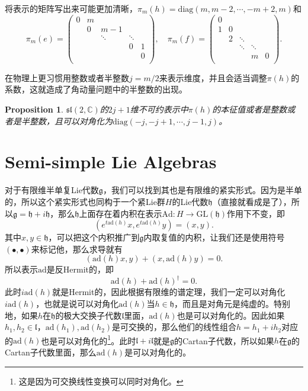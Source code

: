 \documentclass[8pt]{book}
\theoremstyle{plain}
\newtheorem{pro}[defi]{Proposition}
\newcommand{\lag}{{\mathfrak{g}}}  %
\newcommand{\ad}{{\mathrm{ad}}}
\begin{document}
将表示的矩阵写出来可能更加清晰，$\pi_m(h)=\mathrm{diag}(m,m-2,\cdots,-m+2,m)$和
\[
\pi_m(e)=\begin{pmatrix}
	0&m&&&\\
	&0&m-1&&\\
	&&\ddots&\ddots&\\
	&&&0&1\\
	&&&&0\\
\end{pmatrix},\quad
\pi_m(f)=\begin{pmatrix}
	0&&&&\\
	1&0&&&\\
	&2&\ddots&&\\
	&&\ddots&\ddots&\\
	&&&m&0\\
\end{pmatrix}.
\]

在物理上更习惯用整数或者半整数$j=m/2$来表示维度，并且会适当调整$\pi(h)$的系数，这就造成了角动量问题中的半整数的出现。
\begin{pro}
$\mathfrak{sl}(2,\mathbb{C})$的$2j+1$维不可约表示中$\pi(h)$的本征值或者是整数或者是半整数，且可以对角化为$\mathrm{diag}(-j,-j+1,\cdots,j-1,j)$。
\end{pro}

\section{Semi-simple Lie Algebras}
对于有限维半单复Lie代数$\lag$，我们可以找到其也是有限维的紧实形式。因为是半单的，所以这个紧实形式也同构于一个紧Lie群$H$的Lie代数$\mathfrak{h}$（直接就看成是了），所以$\lag=\mathfrak{h}+i\mathfrak{h}$，那么$\mathfrak{h}$上面存在着内积在表示$\mathrm{Ad}:H\to \mathrm{GL}(\mathfrak{h})$作用下不变，即
\[
	(e^{t\ad(h)}x,e^{t\ad(h)}y)=(x,y).
\]
其中$x,y\in\mathfrak{h}$，可以把这个内积推广到$\lag$内取复值的内积，让我们还是使用符号$(\bullet,\bullet)$来标记他，那么求导就有
\[
	(\ad(h)x,y)+(x,\ad(h)y)=0.
\]
所以表示$\ad$是反Hermit的，即
\[
	\ad(h)+\ad(h)^\dag=0.
\]
此时$i\ad(h)$就是Hermit的，因此根据有限维的谱定理，我们一定可以对角化$i\ad(h)$，也就是说可以对角化$\ad(h)$当$h\in \mathfrak{h}$，而且是对角元是纯虚的。特别地，如果$h$在$\mathfrak{h}$的极大交换子代数$\mathfrak{l}$里面，$\ad(h)$也是可以对角化的。因此如果$h_1,h_2\in\mathfrak{l}$，$\ad(h_1),\ad(h_2)$是可交换的，那么他们的线性组合$h=h_1+ih_2$对应的$\ad(h)$也是可以对角化的\footnote{这是因为可交换线性变换可以同时对角化。}。此时$\mathfrak{l}+i\mathfrak{l}$就是$\lag$的Cartan子代数，所以如果$h$在$\lag$的Cartan子代数里面，那么$\ad(h)$是可以对角化的。
\end{document}
